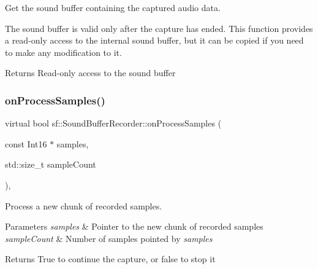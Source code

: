 Get the sound buffer containing the captured audio data. 

The sound buffer is valid only after the capture has ended. This function provides a read-\/only access to the internal sound buffer, but it can be copied if you need to make any modification to it.

\begin{DoxyReturn}{Returns}
Read-\/only access to the sound buffer \begin{DoxyVerb}\end{DoxyVerb}
 
\end{DoxyReturn}
\mbox{\label{classsf_1_1_sound_buffer_recorder_a9ceb94de14632ae8c1b78faf603b4767}} 
\subsubsection{\texorpdfstring{onProcessSamples()}{onProcessSamples()}}
{\footnotesize\ttfamily virtual bool sf\+::\+Sound\+Buffer\+Recorder\+::on\+Process\+Samples (\begin{DoxyParamCaption}\item[{const Int16 $\ast$}]{samples,  }\item[{std\+::size\+\_\+t}]{sample\+Count }\end{DoxyParamCaption})\hspace{0.3cm}{\ttfamily [protected]}, {\ttfamily [virtual]}}



Process a new chunk of recorded samples. 


\begin{DoxyParams}{Parameters}
{\em samples} & Pointer to the new chunk of recorded samples \\
\hline
{\em sample\+Count} & Number of samples pointed by {\itshape samples} \\
\hline
\end{DoxyParams}
\begin{DoxyReturn}{Returns}
True to continue the capture, or false to stop it \begin{DoxyVerb}\end{DoxyVerb}
 
\end{DoxyReturn}


